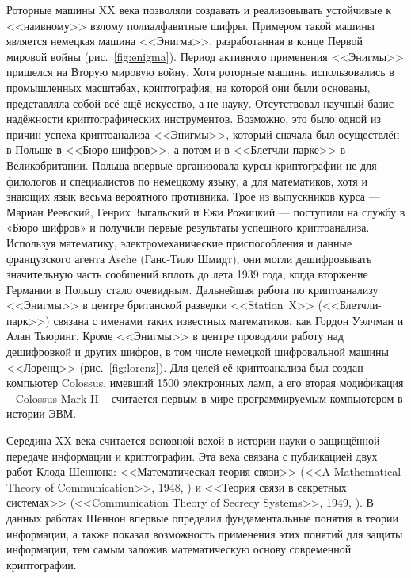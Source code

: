 Роторные машины XX века позволяли создавать и реализовывать устойчивые к <<наивному>> взлому полиалфавитные шифры. Примером такой машины является немецкая машина <<Энигма>>, разработанная в конце Первой мировой войны (рис.~\ref{fig:enigma}). Период активного применения <<Энигмы>> пришелся на Вторую мировую войну. Хотя роторные машины использовались в промышленных масштабах, криптография, на которой они были основаны, представляла собой всё ещё искусство, а не науку. Отсутствовал научный базис надёжности криптографических инструментов. Возможно, это было одной из причин успеха криптоанализа <<Энигмы>>, который сначала был осуществлён в Польше в <<Бюро шифров>>, а потом и в <<Блетчли-парке>> в Великобритании. Польша впервые организовала курсы криптографии не для филологов и специалистов по немецкому языку, а для математиков, хотя и знающих язык весьма вероятного противника. Трое из выпускников курса — Мариан Реевский, Генрих Зыгальский и Ежи Рожицкий — поступили на службу в «Бюро шифров» и получили первые результаты успешного криптоанализа. Используя математику, электромеханические приспособления и данные французского агента Asche (Ганс-Тило Шмидт), они могли дешифровывать значительную часть сообщений вплоть до лета 1939 года, когда вторжение Германии в Польшу стало очевидным. Дальнейшая работа по криптоанализу <<Энигмы>> в центре британской разведки <<Station~X>> (<<Блетчли-парк>>) связана с именами таких известных математиков, как Гордон Уэлчман и Алан Тьюринг. Кроме <<Энигмы>> в центре проводили работу над дешифровкой и других шифров, в том числе немецкой шифровальной машины <<Лоренц>> (рис.~\ref{fig:lorenz}). Для целей её криптоанализа был создан компьютер Colossus, имевший 1500 электронных ламп, а его вторая модификация -- Colossus Mark II -- считается первым в мире программируемым компьютером в истории ЭВМ.

Середина XX века считается основной вехой в истории науки о защищённой передаче информации и криптографии. Эта веха связана с публикацией двух работ Клода Шеннона: <<Математическая теория связи>> (<<A Mathematical Theory of Communication>>, 1948, \cite{Shannon:1948:MTCa, Shannon:1948:MTCb}) и <<Теория связи в секретных системах>> (<<Communication Theory of Secrecy Systems>>, 1949, \cite{Shannon:1949:CTS}). В данных работах Шеннон впервые определил фундаментальные понятия в теории информации, а также показал возможность применения этих понятий для защиты информации, тем самым заложив математическую основу современной криптографии.


